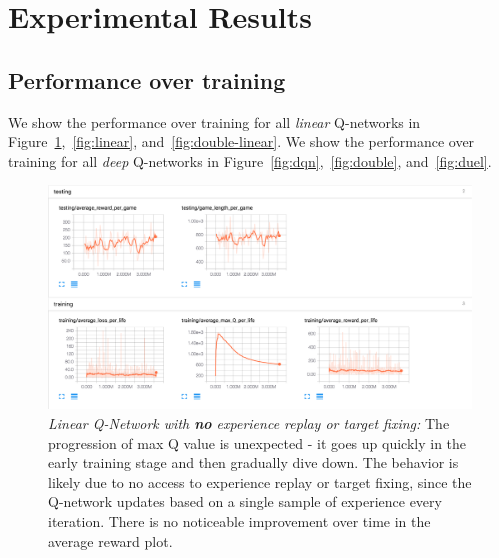 \documentclass{article}
\begin{document}


\section{Experimental Results}

\subsection{Performance over training}
We show the performance over training for all {\em linear} Q-networks in Figure~\ref{fig:linear-simple},~\ref{fig:linear}, and~\ref{fig:double-linear}. We show the performance over training for all {\em deep} Q-networks in Figure~\ref{fig:dqn},~\ref{fig:double}, and~\ref{fig:duel}. 
\begin{figure}[h]
\centering
\includegraphics[width=\linewidth]{plots/linear_simple.png}
\caption{{\em Linear Q-Network with {\bf no} experience replay or target fixing:} The progression of max Q value is unexpected - it goes up quickly in the early training stage and then gradually dive down. The behavior is likely due to no access to experience replay or target fixing, since the Q-network updates based on a single sample of experience every iteration. There is no noticeable improvement over time in the average reward plot. }
\label{fig:linear-simple}
\end{figure}
\end{document}
